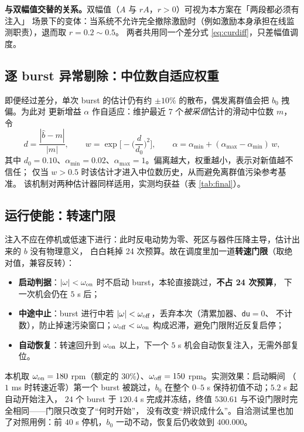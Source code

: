 \documentclass[11pt,a4paper]{ctexart}
\begin{document}
\textbf{与双幅值交替的关系。}双幅值（$A$ 与 $rA$，$r>0$）可视为本方案在「两段都必须有注入」
场景下的变体：当系统不允许完全撤除激励时（例如激励本身承担在线监测职责），退而取 $r=0.2\sim0.5$。
两者共用同一个差分式 \eqref{eq:curdiff}，只差幅值调度。

\subsection{逐 burst 异常剔除：中位数自适应权重}

即便经过差分，单次 burst 的估计仍有约 $\pm10\%$ 的散布，偶发离群值会把 $b_0$ 拽偏。为此对
更新增益 $\alpha$ 作自适应：维护最近 $7$ 个\emph{被采信}估计的滑动中位数 $m$，令
\begin{equation}
d=\frac{|\hat b-m|}{|m|},\qquad
w=\exp\!\Big[-\Big(\frac{d}{d_0}\Big)^2\Big],\qquad
\alpha=\alpha_{\min}+(\alpha_{\max}-\alpha_{\min})\,w ,
\label{eq:amed}
\end{equation}
其中 $d_0=0.10$、$\alpha_{\min}=0.02$、$\alpha_{\max}=1$。偏离越大，权重越小，表示对新值越不信任；
仅当 $w>0.5$ 时该估计才进入中位数历史，从而避免离群值污染参考基准。
该机制对两种估计器同样适用，实测均获益（表 \ref{tab:final}）。

\subsection{运行使能：转速门限}
\label{sec:enable}

注入不应在停机或低速下进行：此时反电动势为零、死区与器件压降主导，估计出来的 $b$ 没有物理意义，
白白耗掉 24 次预算。故在调度里加一道\textbf{转速门限}（取绝对值，兼容反转）：

\begin{itemize}
\item \textbf{启动判据}：$|\omega|<\omega_{\rm on}$ 时不启动 burst，本轮直接跳过，\textbf{不占 24 次预算}，
下一次机会仍在 $5$ s 后；
\item \textbf{中途中止}：burst 进行中若 $|\omega|<\omega_{\rm off}$，丢弃本次（清累加器、\texttt{du}$=0$、
不计数），防止掉速污染窗口；$\omega_{\rm off}<\omega_{\rm on}$ 构成迟滞，避免门限附近反复启停；
\item \textbf{自动恢复}：转速回升到 $\omega_{\rm on}$ 以上，下一个 $5$ s 机会自动恢复注入，无需外部复位。
\end{itemize}

本机取 $\omega_{\rm on}=180$ rpm（额定的 $30\%$）、$\omega_{\rm off}=150$ rpm。实测效果：启动瞬间
（$1$ ms 时转速近零）第一个 burst 被跳过，$b_0$ 在整个 $0$–$5$ s 保持初值不动；$5.2$ s 起自动开始注入，
$24$ 个 burst 于 $120.4$ s 完成并冻结，终值 $530.61$ 与不设门限时完全相同——门限只改变了“何时开始”，
没有改变“辨识成什么”。自洽测试里也加了对照用例：前 $40$ s 停机，$b_0$ 一动不动，恢复后仍收敛到 $400.000$。
\end{document}
